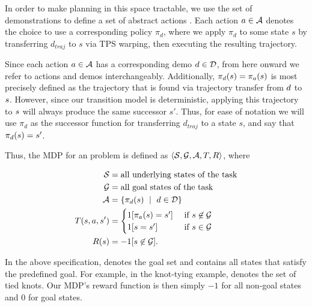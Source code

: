 In order to make planning in this space tractable, we use the set of
demonstrations \demoset{} to define a set of abstract actions \actionset{}. Each
action $a \in \mathcal{A}$ denotes the choice to use a corresponding
policy $\pi_d$, where we apply $\pi_d$ to some state $s$ by transferring
$d_{traj}$ to $s$ via TPS warping, then executing the resulting trajectory.

Since each action $a \in \mathcal{A}$ has a corresponding demo $d
\in \mathcal{D}$, from here onward we refer to actions and demos
interchangeably. Additionally, $\pi_{d}(s) =
\pi_{a}(s)$ is most precisely defined as the trajectory that is
found via trajectory transfer from $d$ to $s$. However, since our
transition model is deterministic, applying this trajectory to $s$ will
always produce the same successor $s'$. Thus, for ease of notation we will use
$\pi_{d}$ as the successor function for transferring $d_{traj}$ to a state $s$,
and say that $\pi_{d}(s) = s'$.

Thus, the MDP for an \mmql{} problem is defined as
$\langle\mathcal{S},\mathcal{G},\mathcal{A},T,R\rangle$, where

\begin{equation}
\begin{aligned}
\mathcal{S}{} &=  \text{all underlying states of the task} \\
\mathcal{G}{} &=  \text{all goal states of the task} \\
\mathcal{A}{} &= \{\pi_{d{}}(s{})\ \mid \text{ } d{} \in \mathcal{D}{}\} \\
T{}(s{}, a{}, s'{}) &=
    \begin{cases}
    1[\pi_{a{}}(s{}) = s'{}] &\text{ if } s{} \not \in \mathcal{G}{} \\
    1[s{} = s{}'] &\text{ if } s{} \in \mathcal{G}{}
    \end{cases}\\
R(s{}) &= -1 {[ s{} \not \in \mathcal{G}{} ]}. \\
\end{aligned}
\end{equation}

In the above specification, \goalset{} denotes the goal set and contains all
states that satisfy the predefined goal. For example, in the knot-tying example,
\goalset{} denotes the set of tied knots.  Our MDP's reward function is then
simply $-1$ for all non-goal states and $0$ for goal states.


